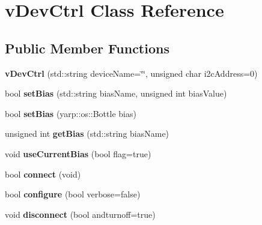 \hypertarget{classvDevCtrl}{}\section{v\+Dev\+Ctrl Class Reference}
\label{classvDevCtrl}
\subsection*{Public Member Functions}
\begin{DoxyCompactItemize}
\item 
{\bfseries v\+Dev\+Ctrl} (std\+::string device\+Name=\char`\"{}\char`\"{}, unsigned char i2c\+Address=0)\hypertarget{classvDevCtrl_a28270bc81b8f37400562730649b9ea20}{}\label{classvDevCtrl_a28270bc81b8f37400562730649b9ea20}

\item 
bool {\bfseries set\+Bias} (std\+::string bias\+Name, unsigned int bias\+Value)\hypertarget{classvDevCtrl_ad7c8b642dc056c3e0475af546ed6e534}{}\label{classvDevCtrl_ad7c8b642dc056c3e0475af546ed6e534}

\item 
bool {\bfseries set\+Bias} (yarp\+::os\+::\+Bottle bias)\hypertarget{classvDevCtrl_ac95a8bc8aedcd40fa1fa8089e568390b}{}\label{classvDevCtrl_ac95a8bc8aedcd40fa1fa8089e568390b}

\item 
unsigned int {\bfseries get\+Bias} (std\+::string bias\+Name)\hypertarget{classvDevCtrl_a37baee231dd38b573c674fca0ac0024e}{}\label{classvDevCtrl_a37baee231dd38b573c674fca0ac0024e}

\item 
void {\bfseries use\+Current\+Bias} (bool flag=true)\hypertarget{classvDevCtrl_a051225ff9d84a5699595827e64dc0148}{}\label{classvDevCtrl_a051225ff9d84a5699595827e64dc0148}

\item 
bool {\bfseries connect} (void)\hypertarget{classvDevCtrl_af6ccda24918a78cd5eb800c3f11c07c4}{}\label{classvDevCtrl_af6ccda24918a78cd5eb800c3f11c07c4}

\item 
bool {\bfseries configure} (bool verbose=false)\hypertarget{classvDevCtrl_a432d0c5cb40afbce3e14a685cfdd11c0}{}\label{classvDevCtrl_a432d0c5cb40afbce3e14a685cfdd11c0}

\item 
void {\bfseries disconnect} (bool andturnoff=true)\hypertarget{classvDevCtrl_a274051caa72b84acac607ebb3d7ec2e2}{}\label{classvDevCtrl_a274051caa72b84acac607ebb3d7ec2e2}


\end{DoxyCompactItemize}
